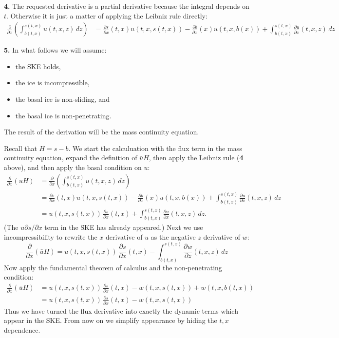\documentclass[12pt]{amsart}
\newcommand{\prob}[1]{\bigskip\noindent\textbf{#1.}\quad }
\begin{document}
\prob{4}  The requested derivative is a partial derivative because the integral depends on $t$.  Otherwise it is just a matter of applying the Leibniz rule directly:
{\small
\begin{align*}
\frac{\partial}{\partial x}\left(\int_{b(t,x)}^{s(t,x)} u(t,x,z)\,dz\right) &= \frac{\partial s}{\partial x}(t,x) u(t,x,s(t,x)) - \frac{\partial b}{\partial x}(x) u(t,x,b(x)) + \int_{b(t,x)}^{s(t,x)} \frac{\partial u}{\partial x}(t,x,z)\,dz
\end{align*}
}


\prob{5}  In what follows we will assume:
\begin{itemize}
\item the SKE holds,
\item the ice is incompressible,
\item the basal ice is non-sliding, and
\item the basal ice is non-penetrating.
\end{itemize}
The result of the derivation will be the mass continuity equation.

Recall that $H=s-b$.  We start the calculuation with the flux term in the mass continuity equation, expand the definition of $\bar u H$, then apply the Leibniz rule (\textbf{4} above), and then apply the basal condition on $u$:
\begin{align*}
\frac{\partial}{\partial x}(\bar u H) &= \frac{\partial}{\partial x}\left(\int_{b(t,x)}^{s(t,x)} u(t,x,z)\,dz\right) \\
   &= \frac{\partial s}{\partial x}(t,x) u(t,x,s(t,x)) - \frac{\partial b}{\partial x}(x) u(t,x,b(x)) + \int_{b(t,x)}^{s(t,x)} \frac{\partial u}{\partial x}(t,x,z)\,dz \\
   &= u(t,x,s(t,x))\,\frac{\partial s}{\partial x}(t,x) + \int_{b(t,x)}^{s(t,x)} \frac{\partial u}{\partial x}(t,x,z)\,dz.
\end{align*}
(The $u \partial s/\partial x$ term in the SKE has already appeared.)  Next we use incompressibility to rewrite the $x$ derivative of $u$ as the negative $z$ derivative of $w$:
  $$\frac{\partial}{\partial x}(\bar u H) = u(t,x,s(t,x))\,\frac{\partial s}{\partial x}(t,x) - \int_{b(t,x)}^{s(t,x)} \frac{\partial w}{\partial z}(t,x,z)\,dz$$
Now apply the fundamental theorem of calculus and the non-penetrating condition:
\begin{align*}
\frac{\partial}{\partial x}(\bar u H) &= u(t,x,s(t,x))\,\frac{\partial s}{\partial x}(t,x) - w(t,x,s(t,x)) + w(t,x,b(t,x)) \\
  &= u(t,x,s(t,x))\,\frac{\partial s}{\partial x}(t,x) - w(t,x,s(t,x))
\end{align*}
Thus we have turned the flux derivative into exactly the dynamic terms which appear in the SKE.  From now on we simplify appearance by hiding the $t,x$ dependence.
\end{document}
